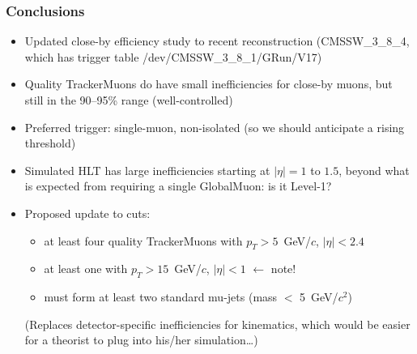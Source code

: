 \documentclass[compress]{beamer}
\begin{document}


\begin{frame}
\frametitle{Conclusions}
\begin{itemize}\setlength{\itemsep}{0.1 cm}
\item Updated close-by efficiency study to recent reconstruction {\scriptsize (CMSSW\_3\_8\_4, which has trigger table /dev/CMSSW\_3\_8\_1/GRun/V17)}

\item Quality TrackerMuons do have small inefficiencies for close-by
  muons, but still in the 90--95\% range (well-controlled)

\item Preferred trigger: single-muon, non-isolated (so we should
  anticipate a rising threshold)

\item Simulated HLT has large inefficiencies starting at $|\eta| = 1$
  to $1.5$, beyond what is expected from requiring a single GlobalMuon: is it Level-1?

\item Proposed update to cuts:
\begin{itemize}
\item at least four quality TrackerMuons with $p_T > 5$~GeV/$c$, $|\eta| < 2.4$
\item at least one with $p_T > 15$~GeV/$c$, $|\eta| < 1$ \hspace{0.25 cm} $\leftarrow$ note!
\item must form at least two standard mu-jets (mass $<$ 5~GeV/$c^2$)
\end{itemize}

(Replaces detector-specific inefficiencies for kinematics, which would
be easier for a theorist to plug into his/her simulation\ldots)
\end{itemize}
\label{numpages}
\end{frame}

\end{document}
